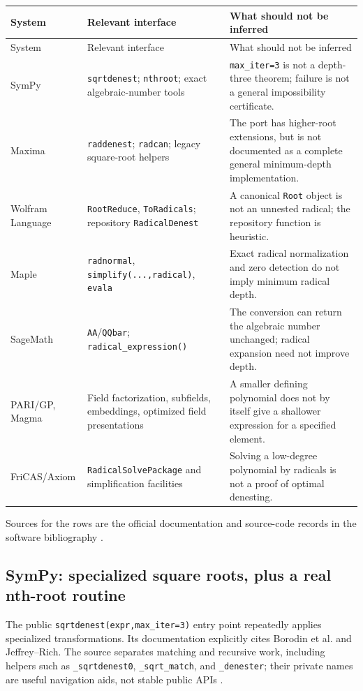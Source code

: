 \documentclass[11pt,a4paper]{article}
\numberwithin{equation}{section}
\theoremstyle{definition}\newtheorem{definition}[theorem]{Definition}
\theoremstyle{remark}\newtheorem{remark}[theorem]{Remark}
\begin{document}
\begin{longtable}{@{}>{\raggedright\arraybackslash}p{}>{\raggedright\arraybackslash}p{}>{\raggedright\arraybackslash}p{}@{}}
\toprule
System & Relevant interface & What should not be inferred \\
\midrule\endfirsthead
\toprule System & Relevant interface & What should not be inferred \\
\midrule\endhead
SymPy & \texttt{sqrtdenest}; \texttt{nthroot}; exact algebraic-number tools & \texttt{max\_iter=3} is not a depth-three theorem; failure is not a general impossibility certificate.\\[4pt]
Maxima & \texttt{raddenest}; \texttt{radcan}; legacy square-root helpers & The port has higher-root extensions, but is not documented as a complete general minimum-depth implementation.\\[4pt]
Wolfram Language & \texttt{RootReduce}, \texttt{ToRadicals}; repository \texttt{RadicalDenest} & A canonical \texttt{Root} object is not an unnested radical; the repository function is heuristic.\\[4pt]
Maple & \texttt{radnormal}, \texttt{simplify(...,radical)}, \texttt{evala} & Exact radical normalization and zero detection do not imply minimum radical depth.\\[4pt]
SageMath & \texttt{AA}/\texttt{QQbar}; \texttt{radical\_expression()} & The conversion can return the algebraic number unchanged; radical expansion need not improve depth.\\[4pt]
PARI/GP, Magma & Field factorization, subfields, embeddings, optimized field presentations & A smaller defining polynomial does not by itself give a shallower expression for a specified element.\\[4pt]
FriCAS/Axiom & \texttt{RadicalSolvePackage} and simplification facilities & Solving a low-degree polynomial by radicals is not a proof of optimal denesting.\\
\bottomrule
\end{longtable}
Sources for the rows are the official documentation and source-code records in the software bibliography \cite{sympydocs,sympysrc,raddenestsrc,wolframroot,wolframradical,wolframrd,maplerad,maplesimp,sageaa,sagesymbolic,pari,magma,fricas}.

\subsection{SymPy: specialized square roots, plus a real nth-root routine}
The public \texttt{sqrtdenest(expr,max\_iter=3)} entry point repeatedly applies specialized transformations. Its documentation explicitly cites Borodin et al. and Jeffrey--Rich. The source separates matching and recursive work, including helpers such as \texttt{\_sqrtdenest0}, \texttt{\_sqrt\_match}, and \texttt{\_denester}; their private names are useful navigation aids, not stable public APIs \cite{sympydocs,sympysrc}.
\end{document}
